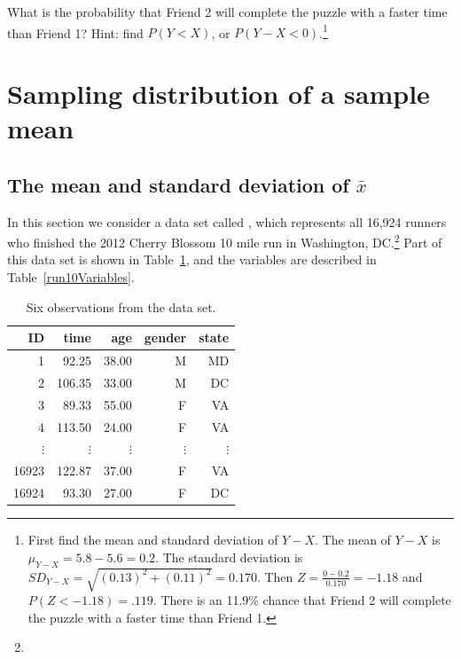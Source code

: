 \begin{exercise}
What is the probability that Friend 2 will complete the puzzle with a faster time than Friend 1?  Hint:  find $P(Y < X)$, or $P(Y - X < 0)$.\footnote{First find the mean and standard deviation of $Y - X$. The mean of $Y - X$ is $\mu_{Y-X} = 5.8 - 5.6 =  0.2$. The standard deviation is  $SD_{Y-X}=\sqrt{(0.13)^2+(0.11)^2}=0.170$. Then $Z=\frac{0-0.2}{0.170}=-1.18$ and $P(Z < -1.18)= .119$. There is an 11.9\% chance that Friend 2 will complete the puzzle with a faster time than Friend 1.}
\end{exercise}


\section[Sampling distribution of a sample mean]{Sampling distribution of a sample mean }

\label{distributionofxbar}

\subsection{The mean and standard deviation of $\bar{x}$}


In this section we consider a data set called , which represents all 16,924 runners who finished the 2012 Cherry Blossom 10 mile run in Washington, DC.\footnote{} Part of this data set is shown in Table~\ref{run10DF}, and the variables are described in Table~\ref{run10Variables}.

\begin{table}[h]
\centering
\begin{tabular}{rrrrr}
  \hline
ID & time & age & gender & state \\ 
  \hline
1 & 92.25 & 38.00 & M & MD \\ 
2 & 106.35 & 33.00 & M & DC \\ 
3 & 89.33 & 55.00 & F & VA \\ 
4 & 113.50 & 24.00 & F & VA \\ 
$\vdots$ & $\vdots$ & $\vdots$ & $\vdots$ & $\vdots$ \\
16923 & 122.87 & 37.00 & F & VA \\ 
16924 & 93.30 & 27.00 & F & DC \\ 
   \hline
\end{tabular}
\caption{Six observations from the  data set.}
\label{run10DF}
\end{table}

